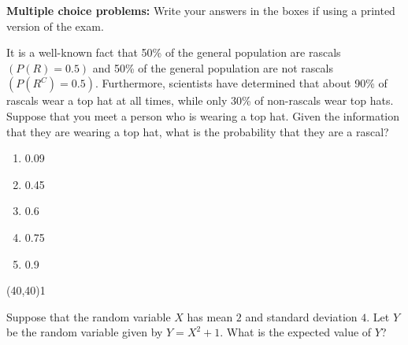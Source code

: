 \documentclass[addpoints]{exam}
\def\solutions{0}
\begin{document}
{\renewcommand{\arraystretch}{1.5}

\vspace{8mm}



\label{---Problems---}


\vspace{3cm}

{\begin{center} {\bf Multiple choice problems:} Write your answers in the boxes if using a printed version of the exam. \end{center}}\vspace{2mm}


\begin{questions}
	
\question[3]  It is a well-known fact that 50\% of the general population are rascals $(P(R) = 0.5)$ and 50\% of the general population are not rascals $(P(R^C) = 0.5).$ Furthermore, scientists have determined that about 90\% of rascals wear a top hat at all times, while only 30\% of non-rascals wear top hats. Suppose that you meet a person who is wearing a top hat. Given the information that they are wearing a top hat, what is the probability that they are a rascal?

\vspace{2mm}
\begin{minipage}[b]{.85\textwidth}
	\begin{enumerate}[label=\Alph*.]
		\item 0.09
		\item 0.45
		\item 0.6
		\item 0.75
		\item 0.9

	\end{enumerate}
\end{minipage}
\begin{minipage}[b]{.1\textwidth}
	\vspace{\fill}\framebox(40,40){\if\solutions1 \fi}
\end{minipage}

\question[3]   Suppose that the random variable $X$ has mean $2$ and standard deviation $4$. Let $Y$ be the random variable given by $Y = X^2 + 1$. What is the expected value of $Y$?
\vspace{2mm}


\end{questions}}
\end{document}
